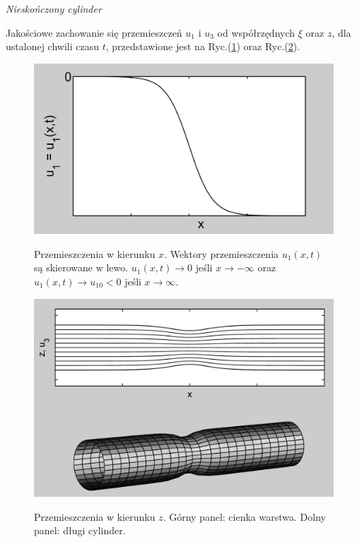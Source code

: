 \noindent \textit{Nieskończony cylinder}

\medskip 

Jakościowe zachowanie się przemieszczeń $u_1$ i $u_3$ od współrzędnych $\xi$ oraz $z$, dla ustalonej chwili czasu $t$, przedstawione jest na Ryc.(\ref{fig3}) oraz Ryc.(\ref{fig4}).


\medskip 

\vspace{0cm}

\begin{figure}[ht!] 
	\centering 
	\includegraphics[width=1\linewidth]{rysunki/rozdzial_3/ku22L.png} \\ 
	\caption[Przemieszczenia w kierunku $x$]{Przemieszczenia w kierunku $x$. Wektory przemieszczenia $u_1(x,t)$ są skierowane w lewo. $u_1(x,t) \to 0$ jeśli $x \to -\infty$ oraz 
		$u_1(x,t) \to u_{10} < 0$ jeśli $x \to \infty$.} \label{fig3}
\end{figure}

\begin{figure}[h]
	\centering 
	\includegraphics[width=1\linewidth]{rysunki/rozdzial_3/uzmech.png} \\
	\caption[Przemieszczenia w kierunku $z$]{Przemieszczenia w kierunku $z$. Górny panel: cienka warstwa. Dolny panel: długi cylinder.}
	\label{fig4}
\end{figure} 

